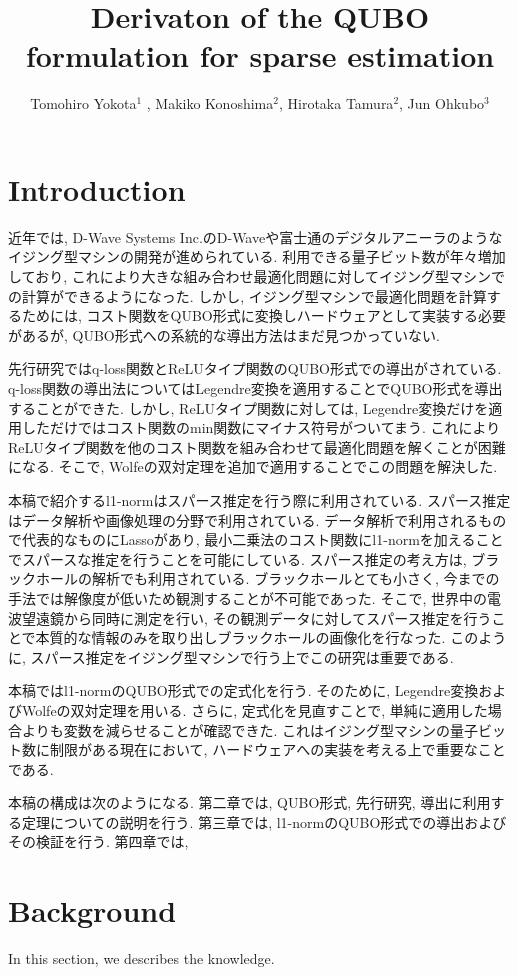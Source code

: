\documentclass[fp,twocolumn]{jpsj3}
\title{Derivaton of the QUBO formulation for sparse estimation}
\author{Tomohiro Yokota$^1$%
  , Makiko Konoshima$^2$, Hirotaka Tamura$^2$, Jun Ohkubo$^3$}
\begin{document}
\maketitle

\section{Introduction}
近年では, D-Wave Systems Inc.のD-Waveや富士通のデジタルアニーラのようなイジング型マシンの開発が進められている. 利用できる量子ビット数が年々増加しており, これにより大きな組み合わせ最適化問題に対してイジング型マシンでの計算ができるようになった. しかし, イジング型マシンで最適化問題を計算するためには, コスト関数をQUBO形式に変換しハードウェアとして実装する必要があるが, QUBO形式への系統的な導出方法はまだ見つかっていない. 

先行研究ではq-loss関数とReLUタイプ関数のQUBO形式での導出がされている. q-loss関数の導出法についてはLegendre変換を適用することでQUBO形式を導出することができた. しかし, ReLUタイプ関数に対しては, Legendre変換だけを適用しただけではコスト関数のmin関数にマイナス符号がついてまう. これによりReLUタイプ関数を他のコスト関数を組み合わせて最適化問題を解くことが困難になる. そこで, Wolfeの双対定理を追加で適用することでこの問題を解決した. 

本稿で紹介するl1-normはスパース推定を行う際に利用されている. スパース推定はデータ解析や画像処理の分野で利用されている. データ解析で利用されるもので代表的なものにLassoがあり, 最小二乗法のコスト関数にl1-normを加えることでスパースな推定を行うことを可能にしている. スパース推定の考え方は, ブラックホールの解析でも利用されている. ブラックホールとても小さく, 今までの手法では解像度が低いため観測することが不可能であった. そこで, 世界中の電波望遠鏡から同時に測定を行い, その観測データに対してスパース推定を行うことで本質的な情報のみを取り出しブラックホールの画像化を行なった. このように, スパース推定をイジング型マシンで行う上でこの研究は重要である.

本稿ではl1-normのQUBO形式での定式化を行う. そのために, Legendre変換およびWolfeの双対定理を用いる. さらに, 定式化を見直すことで, 単純に適用した場合よりも変数を減らせることが確認できた. これはイジング型マシンの量子ビット数に制限がある現在において, ハードウェアへの実装を考える上で重要なことである. 

本稿の構成は次のようになる. 第二章では, QUBO形式, 先行研究, 導出に利用する定理についての説明を行う. 第三章では, l1-normのQUBO形式での導出およびその検証を行う. 第四章では, 

\section{Background}
In this section, we describes the knowledge.
\end{document}
